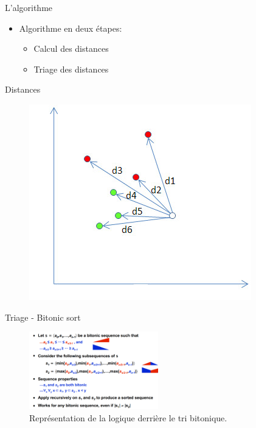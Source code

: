 \documentclass[12pt,a4paper]{beamer}
\begin{document}
\begin{frame}{L'algorithme}
\begin{itemize}
\item Algorithme en deux étapes:
\begin{itemize}
\item Calcul des distances
\item Triage des distances
\end{itemize}
\end{itemize}
\end{frame}

\begin{frame}{Distances}
\begin{figure}
\centering
\includegraphics[scale=0.6]{../figures/knn_distances.jpg}
\end{figure}
\end{frame}

\begin{frame}{Triage - Bitonic sort} 
\begin{figure}[h]
\centering
\includegraphics[width=0.5\textwidth]{../figures/bitonic_split.png}
\caption{\label{fig:BitonicSort}Représentation de la logique derrière le tri bitonique.}
\end{figure}
\end{frame}
\end{document}
